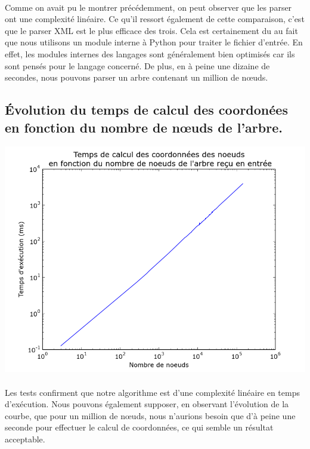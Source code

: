 \paragraph{} Comme on avait pu le montrer précédemment, on peut observer que les parser ont une complexité linéaire. Ce qu'il ressort également de cette comparaison, c'est que le parser XML est le plus efficace des trois. Cela est certainement du au fait que nous utilisons un module interne à Python pour traiter le fichier d'entrée. En effet, les modules internes des langages sont généralement bien optimisés car ils sont pensés pour le langage concerné. De plus, en à peine une dizaine de secondes, nous pouvons parser un arbre contenant un million de n\oe uds.

	\subsection{Évolution du temps de calcul des coordonées en fonction du nombre de n\oe uds de l'arbre.}
	
\begin{center}

\includegraphics[width=0.80\columnwidth]{execTimeCoord}

\end{center}

\paragraph{} Les tests confirment que notre algorithme est d'une complexité linéaire en temps d'exécution. Nous pouvons également supposer, en observant l'évolution de la courbe, que pour un million de n\oe uds, nous n'aurions besoin que d'à peine une seconde pour effectuer le calcul de coordonnées, ce qui semble un résultat acceptable.

